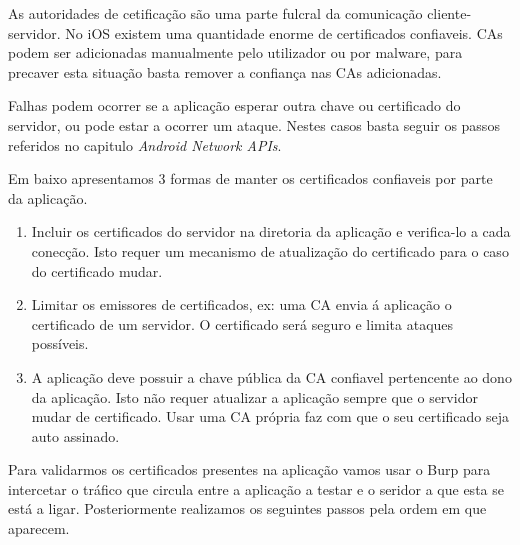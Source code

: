 As autoridades de cetificação são uma parte fulcral da comunicação cliente-servidor. No iOS existem uma quantidade enorme de certificados confiaveis. CAs podem ser adicionadas manualmente pelo utilizador ou por malware, para precaver esta situação basta  remover a confiança nas CAs adicionadas.\par
Falhas podem ocorrer se a aplicação esperar outra chave ou certificado do servidor, ou pode estar a ocorrer um ataque.
Nestes casos basta seguir os passos referidos no capitulo \textit{Android Network APIs}\cite{book}.\par
\hfill\par
Em baixo apresentamos 3 formas de manter os certificados confiaveis por parte da aplicação.
\begin{enumerate}
\item Incluir os certificados do servidor na diretoria da aplicação e verifica-lo a cada conecção. Isto requer um mecanismo de atualização do certificado para o caso do certificado mudar.\par
\hfill\par
\item Limitar os emissores de certificados, ex: uma CA envia á aplicação o certificado de um servidor. O certificado será seguro e limita ataques possíveis.\par
\hfill\par
\item A aplicação deve possuir a chave pública da CA confiavel pertencente ao dono da aplicação. Isto não requer atualizar a aplicação sempre que o servidor mudar de certificado. Usar uma CA própria faz com que o seu certificado seja auto assinado.
\end{enumerate}

Para validarmos os certificados presentes na aplicação vamos usar o Burp para intercetar o tráfico que circula entre a aplicação a testar e o seridor a que esta se está a ligar. Posteriormente realizamos os seguintes passos pela ordem em que aparecem.

